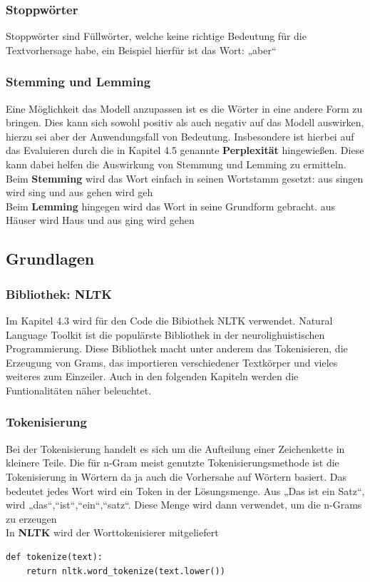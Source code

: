 \documentclass[12pt]{article}
\begin{document}
\subsubsection{Stoppwörter}
\quad Stoppwörter sind Füllwörter, welche keine richtige Bedeutung für die Textvorhersage habe, ein Beispiel hierfür ist das Wort: „aber“
\cite{nilsstuck}
\subsubsection{Stemming und Lemming}
\quad Eine Möglichkeit das Modell anzupassen ist es die Wörter in eine andere Form zu bringen. Dies kann sich sowohl positiv als auch negativ auf das Modell auswirken, hierzu sei aber der Anwendungsfall von Bedeutung. Insbesondere ist hierbei auf das Evaluieren durch die in Kapitel 4.5 genannte \textbf{Perplexität} hingewießen. Diese kann dabei helfen die Auswirkung von Stemmung und Lemming zu ermitteln.
\\Beim \textbf{Stemming} wird das Wort einfach in seinen Wortstamm gesetzt: aus singen wird sing und aus gehen wird geh
\\Beim \textbf{Lemming} hingegen wird das Wort in seine Grundform gebracht. aus Häuser wird Haus und aus ging wird gehen
\cite{kurtiespykes}\cite{jurafsky}
\subsection{Grundlagen}
\subsubsection{Bibliothek: NLTK}
\quad Im Kapitel 4.3 wird für den Code die Bibiothek NLTK verwendet. Natural Language Toolkit ist die populärste Bibliothek in der neurolighuistischen Programmierung. Diese Bibliothek macht unter anderem das Tokenisieren, die Erzeugung von Grams, das importieren verschiedener Textkörper und vieles weiteres zum Einzeiler. Auch in den folgenden Kapiteln werden die Funtionalitäten näher beleuchtet.
\cite{stevenbird}
\subsubsection{Tokenisierung}
\quad Bei der Tokenisierung handelt es sich um die Aufteilung einer Zeichenkette in kleinere Teile. Die für n-Gram meist genutzte Tokenisierungsmethode ist die Tokenisierung in Wörtern da ja auch die Vorhersahe auf Wörtern basiert. Das bedeutet jedes Wort wird ein Token in der Lösungsmenge. Aus „Das ist ein Satz“, wird {„das“,“ist“,“ein“,“satz“}. Diese Menge wird dann verwendet, um die n-Grams zu erzeugen
\\In \textbf{NLTK} wird der Worttokenisierer mitgeliefert
\cite{jurafsky}
\begin{lstlisting}
def tokenize(text):
    return nltk.word_tokenize(text.lower())
\end{lstlisting}
\cite{stevenbird}
\end{document}
